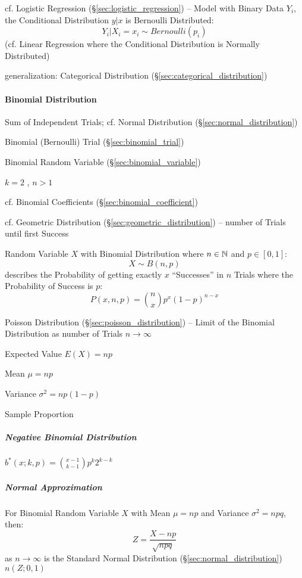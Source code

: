 \fist cf. Logistic Regression (\S\ref{sec:logistic_regression}) -- Model with
Binary Data $Y_i$, the Conditional Distribution $y | x$ is Bernoulli
Distributed:
\[
  Y_i | X_i = x_i \sim Bernoulli(p_i)
\]
(cf. Linear Regression where the Conditional Distribution is Normally
Distributed)

generalization: Categorical Distribution (\S\ref{sec:categorical_distribution})



\paragraph{Binomial Distribution}\label{sec:binomial_distribution}\hfill

Sum of Independent Trials; cf. Normal Distribution
(\S\ref{sec:normal_distribution})

Binomial (Bernoulli) Trial (\S\ref{sec:binomial_trial})

Binomial Random Variable (\S\ref{sec:binomial_variable})

$k = 2$ , $n > 1$

cf. Binomial Coefficients (\S\ref{sec:binomial_coefficient})

\fist cf. Geometric Distribution (\S\ref{sec:geometric_distribution}) -- number
of Trials until first Success

Random Variable $X$ with Binomial Distribution where $n \in \mathbb{N}$ and
$p \in [0,1]$:
\[
  X \sim B(n,p)
\]
describes the Probability of getting exactly $x$ ``Successes'' in $n$ Trials
where the Probability of Success is $p$:
\[
  P(x,n,p) = \binom{n}{x}p^x(1-p)^{n-x}
\]

\fist Poisson Distribution (\S\ref{sec:poisson_distribution}) -- Limit of the
Binomial Distribution as number of Trials $n \rightarrow \infty$

Expected Value $E(X) = np$

Mean $\mu = n p$

Variance $\sigma^2 = n p (1-p)$

Sample Proportion %



\subparagraph{Negative Binomial Distribution}\label{sec:negative_binomial}\hfill

$b^*(x; k,p) = \binom{x-1}{k-1} p^k 2^{k-k}$



\subparagraph{Normal Approximation}\label{sec:normal_approximation}\hfill

For Binomial Random Variable $X$ with Mean $\mu = np$ and Variance
$\sigma^2 = npq$, then:
\[
  Z = \frac{X - np}{\sqrt{npq}}
\]
as $n \rightarrow \infty$ is the Standard Normal Distribution
(\S\ref{sec:normal_distribution}) $n(Z;0,1)$



